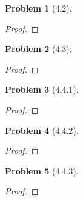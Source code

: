 \documentclass[10pt]{article}
\newcommand{\sk}{\vskip 10mm}
\theoremstyle{plain}
\newtheorem{problem}{Problem}
\theoremstyle{remark}
\begin{document}
\begin{problem}[4.2]
  
\end{problem}

\begin{proof}
  
\end{proof}

\sk

\begin{problem}[4.3]
  
\end{problem}

\begin{proof}
  
\end{proof}

\sk

\begin{problem}[4.4.1]
  
\end{problem}

\begin{proof}
  
\end{proof}

\sk

\begin{problem}[4.4.2]
  
\end{problem}

\begin{proof}
  
\end{proof}

\sk

\begin{problem}[4.4.3]
  
\end{problem}

\begin{proof}
  
\end{proof}

\sk

\end{document}
